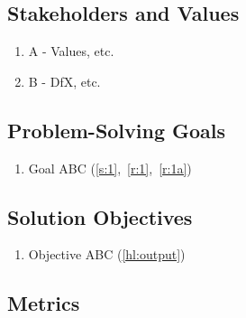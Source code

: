 \documentclass{../tex/report}
\begin{document}
\subsection{Stakeholders and Values}\label{sec:stakeholders}

\begin{enumerate}[label=S\arabic*., ref=S\arabic*]
    \item\label{s:1} A - Values, etc.
    \item\label{s:2} B - DfX, etc.
\end{enumerate}

\clearpage


\subsection{Problem-Solving Goals}\label{sec:goals}

\begin{multicols}{2}[]
    \begin{enumerate}[label=HL\arabic*., ref=HL\arabic*]
        \item\label{hl:output} Goal ABC \hfill (\ref{s:1},~\ref{r:1},~\ref{r:1a})
    \end{enumerate}
\end{multicols}

\subsection{Solution Objectives}\label{sec:objectives}


\begin{multicols}{2}[]
    \begin{enumerate}[label=LL\arabic*., ref=LL\arabic*]
        \item\label{ll:output_variety} Objective ABC \hfill (\ref{hl:output})
    \end{enumerate}
\end{multicols}

\clearpage


\subsection{Metrics}\label{sec:metrics}
\end{document}

